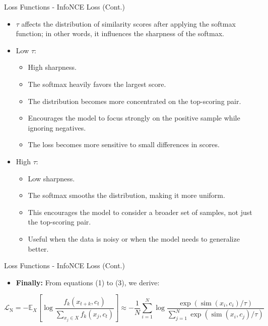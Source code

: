 \documentclass[serif, aspectratio=169]{beamer}
\begin{document}
\begin{frame}{Loss Functions - InfoNCE Loss (Cont.)}
    \begin{itemize}
        \item $\tau$ affects the distribution of similarity scores after applying the softmax function; in other words, it influences the sharpness of the softmax.
        
        \item Low $\tau$:
        \begin{itemize}
            \item High sharpness.
            \item The softmax heavily favors the largest score.
            \item The distribution becomes more concentrated on the top-scoring pair.
            \item Encourages the model to focus strongly on the positive sample while ignoring negatives.
            \item The loss becomes more sensitive to small differences in scores.
        \end{itemize}

        \item High $\tau$:
        \begin{itemize}
            \item Low sharpness.
            \item The softmax smooths the distribution, making it more uniform.
            \item This encourages the model to consider a broader set of samples, not just the top-scoring pair.
            \item Useful when the data is noisy or when the model needs to generalize better.
        \end{itemize}
    \end{itemize}
\end{frame}


\begin{frame}{Loss Functions - InfoNCE Loss (Cont.)}
    \begin{itemize}
        \item \textbf{Finally:} From equations (1) to (3), we derive:
    \end{itemize}

    \begin{equation*}
        \mathcal{L}_{\mathrm{N}}=-{\mathbb{E}_X}\left[\log \frac{f_k\left(x_{t+k}, c_t\right)}{\sum_{x_j \in X} f_k\left(x_j, c_t\right)}\right] \approx
        -\frac{1}{N} \sum_{i=1}^N \log \frac{\exp \left(\operatorname{sim}\left(x_i, c_i\right) / \tau\right)}{\sum_{j=1}^N \exp \left(\operatorname{sim}\left(x_i, c_j\right) / \tau\right)}
    \end{equation*}
\end{frame}
\end{document}
